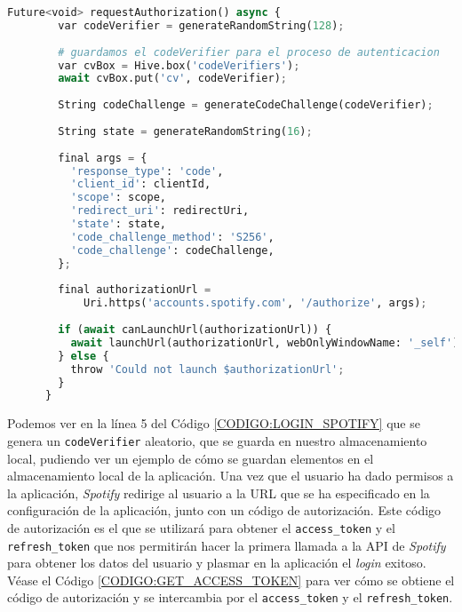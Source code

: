 \begin{lstlisting}[language=python, caption=Lanzar autenticación en \textit{Spotify}, label=CODIGO:LOGIN_SPOTIFY]
    Future<void> requestAuthorization() async {
        var codeVerifier = generateRandomString(128);
      
        # guardamos el codeVerifier para el proceso de autenticacion
        var cvBox = Hive.box('codeVerifiers');
        await cvBox.put('cv', codeVerifier);
      
        String codeChallenge = generateCodeChallenge(codeVerifier);
      
        String state = generateRandomString(16);
      
        final args = {
          'response_type': 'code',
          'client_id': clientId,
          'scope': scope,
          'redirect_uri': redirectUri,
          'state': state,
          'code_challenge_method': 'S256',
          'code_challenge': codeChallenge,
        };
      
        final authorizationUrl =
            Uri.https('accounts.spotify.com', '/authorize', args);
      
        if (await canLaunchUrl(authorizationUrl)) {
          await launchUrl(authorizationUrl, webOnlyWindowName: '_self');
        } else {
          throw 'Could not launch $authorizationUrl';
        }
      }
\end{lstlisting}
Podemos ver en la línea 5 del Código \ref{CODIGO:LOGIN_SPOTIFY} que se genera un \texttt{codeVerifier} aleatorio, que se guarda en nuestro almacenamiento local, pudiendo
ver un ejemplo de cómo se guardan elementos en el almacenamiento local de la aplicación.
Una vez que el usuario ha dado permisos a la aplicación, \textit{Spotify} redirige al usuario a la URL que se ha especificado en la configuración de la aplicación, 
junto con un código de autorización. Este código de autorización es el que se utilizará para obtener el \texttt{access\_token} y el \texttt{refresh\_token} que nos permitirán
hacer la primera llamada a la API de \textit{Spotify} para obtener los datos del usuario y plasmar en la aplicación el \textit{login} exitoso. 
Véase el Código \ref{CODIGO:GET_ACCESS_TOKEN} para ver cómo se obtiene el código de autorización y se intercambia por el \texttt{access\_token} y el \texttt{refresh\_token}. 

